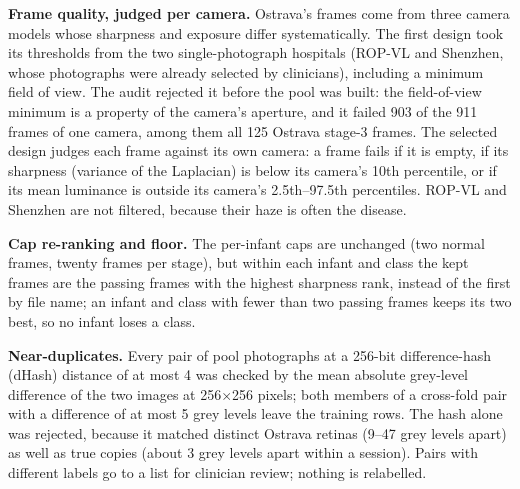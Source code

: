 \textbf{Frame quality, judged per camera.} Ostrava's frames come from three camera models whose sharpness and exposure differ systematically. The first design took its thresholds from the two single-photograph hospitals (ROP-VL and Shenzhen, whose photographs were already selected by clinicians), including a minimum field of view. The audit rejected it before the pool was built: the field-of-view minimum is a property of the camera's aperture, and it failed 903 of the 911 frames of one camera, among them all 125 Ostrava stage-3 frames. The selected design judges each frame against its own camera: a frame fails if it is empty, if its sharpness (variance of the Laplacian) is below its camera's 10th percentile, or if its mean luminance is outside its camera's 2.5th--97.5th percentiles. ROP-VL and Shenzhen are not filtered, because their haze is often the disease.

\textbf{Cap re-ranking and floor.} The per-infant caps are unchanged (two normal frames, twenty frames per stage), but within each infant and class the kept frames are the passing frames with the highest sharpness rank, instead of the first by file name; an infant and class with fewer than two passing frames keeps its two best, so no infant loses a class.

\textbf{Near-duplicates.} Every pair of pool photographs at a 256-bit difference-hash (dHash) distance of at most 4 was checked by the mean absolute grey-level difference of the two images at 256$\times$256 pixels; both members of a cross-fold pair with a difference of at most 5 grey levels leave the training rows. The hash alone was rejected, because it matched distinct Ostrava retinas (9--47 grey levels apart) as well as true copies (about 3 grey levels apart within a session). Pairs with different labels go to a list for clinician review; nothing is relabelled.

